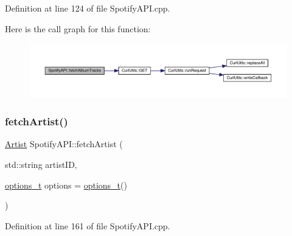 Definition at line 124 of file Spotify\+A\+P\+I.\+cpp.

Here is the call graph for this function\+:
\nopagebreak
\begin{figure}[H]
\begin{center}
\leavevmode
\includegraphics[width=350pt]{class_spotify_a_p_i_a3e007d4199f40cd6227613d28319c175_cgraph}
\end{center}
\end{figure}
\mbox{\label{class_spotify_a_p_i_a6ef5675e1ace89ae83576e424f71c785}} 
\subsubsection{\texorpdfstring{fetch\+Artist()}{fetchArtist()}}
{\footnotesize\ttfamily \mbox{\hyperlink{class_artist}{Artist}} Spotify\+A\+P\+I\+::fetch\+Artist (\begin{DoxyParamCaption}\item[{std\+::string}]{artist\+ID,  }\item[{\mbox{\hyperlink{_spotify_a_p_i_8h_a0ff5cac1a4007bb330b7d9939650c283}{options\+\_\+t}}}]{options = {\ttfamily \mbox{\hyperlink{_spotify_a_p_i_8h_a0ff5cac1a4007bb330b7d9939650c283}{options\+\_\+t}}()} }\end{DoxyParamCaption})}



Definition at line 161 of file Spotify\+A\+P\+I.\+cpp.

